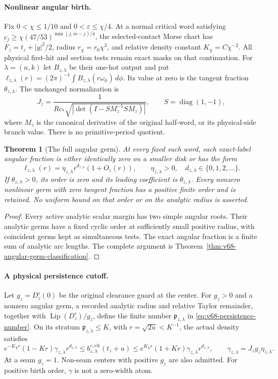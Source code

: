 \documentclass[11pt,reqno]{amsart}
\numberwithin{equation}{section}
\newtheorem{leadtheorem}{Theorem}
\theoremstyle{definition}\newtheorem{definition}[theorem]{Definition}
\theoremstyle{remark}\newtheorem{remark}[theorem]{Remark}
\begin{document}
\paragraph{Nonlinear angular birth.}
Fix $0<\chi\le1/10$ and $0<\varepsilon\le\chi/4$. At a normal
critical word satisfying
$c_j\ge\chi(47/53)^{\min(j,m-j)/4}$, the selected-contact Morse
chart has $F_z=t_z+|y|^2/2$, radius $r_\chi=r_0\chi^3$, and
relative density constant $K_\chi=C\chi^{-2}$. All physical
first-hit and section tests remain exact masks on that continuation.
For $\lambda=(n,k)$ let $B_{z,\lambda}$ be their one-hot output and
put $\ell_{z,\lambda}(r)=(2\pi)^{-1}\int B_{z,\lambda}(r\omega_\phi)\,d\phi$.
Its value at zero is the tangent fraction $\theta_{z,\lambda}$.
The unchanged normalization is
\[
 J_z=\frac1{Rc_*\sqrt{|\det(I-SM_z^{-1}SM_z)|}},
 \qquad S=\operatorname{diag}(1,-1),
\]
where $M_z$ is the canonical derivative of the original half-word,
or its physical-side branch value. There is no primitive-period quotient.

\begin{leadtheorem}[The full angular germ]
\label{thm:intro-v68-germs}
At every fixed such word, each exact-label angular fraction is either
identically zero on a smaller disk or has the form
\[
 \ell_{z,\lambda}(r)=\eta_{z,\lambda}r^{d_{z,\lambda}}
                         (1+O_z(r)),\qquad
 \eta_{z,\lambda}>0,\quad d_{z,\lambda}\in\{0,1,2,\ldots\}.
\]
If $\theta_{z,\lambda}>0$, its order is zero and its leading
coefficient is $\theta_{z,\lambda}$. Every nonzero nonlinear germ
with zero tangent fraction has a positive finite order and is retained.
No uniform bound on that order or on the analytic radius is asserted.
\end{leadtheorem}
\begin{proof}
Every active analytic scalar margin has two simple angular roots.
Their analytic germs have a fixed cyclic order at sufficiently small
positive radius, with coincident germs kept as simultaneous tests.
The exact angular fraction is a finite sum of analytic arc lengths.
The complete argument is Theorem~\ref{thm:v68-angular-germ-classification}.
\end{proof}

\paragraph{A physical persistence cutoff.}
Let $g_z=D_z^\varepsilon(0)$ be the original clearance guard at the
center. For $g_z>0$ and a nonzero angular germ, a recorded analytic
radius and relative Taylor remainder, together with
$\operatorname{Lip}(D_z^\varepsilon)/g_z$, define the finite number
$\mathfrak p_{z,\lambda}$ in \eqref{eq:v68-persistence-number}.
On its stratum $\mathfrak p_{z,\lambda}\le K$, with
$r=\sqrt{2u}<K^{-1}$, the actual density satisfies
\[
 e^{-K_\chi r}(1-Kr)\gamma_{z,\lambda}r^{d_{z,\lambda}}
 \le b_{z,\lambda}^{\varepsilon,\mathrm{clr}}(t_z+u)
 \le e^{K_\chi r}(1+Kr)\gamma_{z,\lambda}r^{d_{z,\lambda}},
 \qquad \gamma_{z,\lambda}=J_zg_z\eta_{z,\lambda}.
\]
At a seam $g_z=1$. Non-seam centers with positive $g_z$ are also
admitted. For positive birth order, $\gamma$ is not a zero-width atom.
\end{document}
